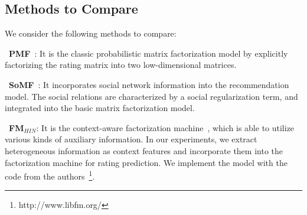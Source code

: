 %


\subsection{Methods to Compare}
We consider the following methods to compare:

\textbullet\ \textbf{PMF}~\cite{mnih2008probabilistic}: It is the classic probabilistic matrix factorization model by explicitly factorizing the rating matrix into two low-dimensional matrices.

\textbullet\ \textbf{SoMF}~\cite{ma2011recommender}: It incorporates social network information into the recommendation model.
The social relations are characterized by a social regularization term, and integrated into the basic matrix factorization model.

\textbullet\ \textbf{FM$_{HIN}$}: It is the context-aware factorization machine~\cite{rendle2012factorization}, which is able to utilize various kinds of auxiliary information. In our experiments, we extract heterogeneous information as context features and incorporate them into the factorization machine for rating prediction. We implement the model with the code from the authors~\footnote{http://www.libfm.org/}.


